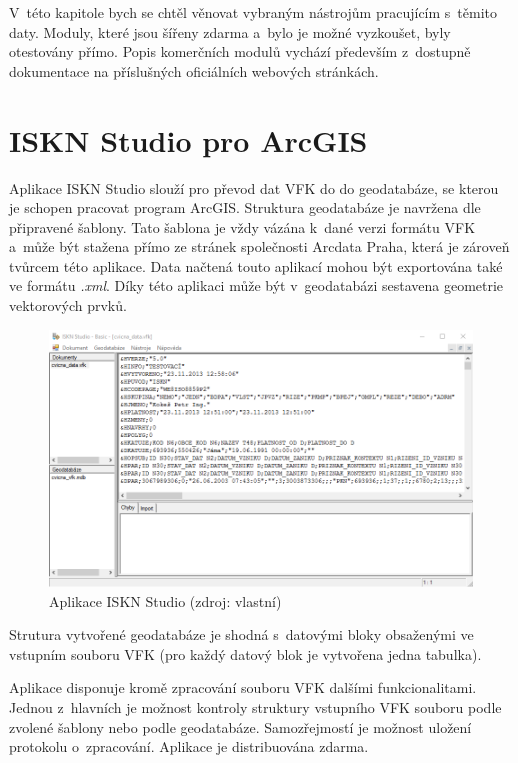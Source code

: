 \documentclass[a4paper,12pt,oneside]{book}
\begin{document}
V~této kapitole bych se chtěl věnovat vybraným nástrojům pracujícím s~těmito daty. Moduly, které jsou šířeny zdarma a~bylo je možné vyzkoušet, byly otestovány přímo. Popis komerčních modulů vychází především z~dostupně dokumentace na příslušných oficiálních webových stránkách.

\section{ISKN Studio pro ArcGIS}
\label{l_iskn_studio}
Aplikace ISKN Studio slouží pro převod dat VFK do do geodatabáze, se kterou je schopen pracovat program ArcGIS. Struktura geodatabáze je navržena dle připravené šablony. Tato šablona je vždy vázána k~dané verzi formátu VFK a~může být stažena přímo ze stránek společnosti Arcdata Praha, která je zároveň tvůrcem této aplikace. Data načtená touto aplikací mohou být exportována také ve formátu \textit{.xml}. Díky této aplikaci může být v~geodatabázi sestavena geometrie vektorových prvků. \cite{iskn_studio}

\begin{figure}[htb]
\centering
\includegraphics[width=\textwidth]{images/ISKNStudio-aplikace.png}
\caption[Aplikace ISKN Studio]{Aplikace ISKN Studio (zdroj: vlastní)}
\end{figure}

Strutura vytvořené geodatabáze je shodná s~datovými bloky obsaženými ve vstupním souboru VFK (pro každý datový blok je vytvořena jedna tabulka). 

Aplikace disponuje kromě zpracování souboru VFK dalšími funkcionalitami. Jednou z~hlavních je možnost kontroly struktury vstupního VFK souboru podle zvolené šablony nebo podle geodatabáze. Samozřejmostí je možnost uložení protokolu o~zpracování. Aplikace je distribuována zdarma.
\end{document}
